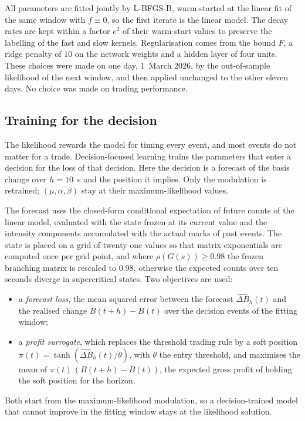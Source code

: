 \documentclass[a4paper,11pt]{article}
\begin{document}
All parameters are fitted jointly by L-BFGS-B, warm-started at the linear fit of the same window with $f \equiv 0$, so the first iterate is the linear model. The decay rates are kept within a factor $e^2$ of their warm-start values to preserve the labelling of the fast and slow kernels. Regularisation comes from the bound $F$, a ridge penalty of $10$ on the network weights and a hidden layer of four units. These choices were made on one day, 1~March 2026, by the out-of-sample likelihood of the next window, and then applied unchanged to the other eleven days. No choice was made on trading performance.

\subsection{Training for the decision}

The likelihood rewards the model for timing every event, and most events do not matter for a trade. Decision-focused learning \cite{donti2017,elmachtoub2022} trains the parameters that enter a decision for the loss of that decision. Here the decision is a forecast of the basis change over $h = 10$~s and the position it implies. Only the modulation is retrained; $(\mu, \alpha, \beta)$ stay at their maximum-likelihood values.

The forecast uses the closed-form conditional expectation of future counts of the linear model, evaluated with the state frozen at its current value and the intensity components accumulated with the actual marks of past events. The state is placed on a grid of twenty-one values so that matrix exponentials are computed once per grid point, and where $\rho(G(s)) \ge 0.98$ the frozen branching matrix is rescaled to $0.98$, otherwise the expected counts over ten seconds diverge in supercritical states. Two objectives are used:
\begin{itemize}
\item a \emph{forecast loss}, the mean squared error between the forecast $\widehat{\Delta B}_h(t)$ and the realised change $B(t+h) - B(t)$ over the decision events of the fitting window;
\item a \emph{profit surrogate}, which replaces the threshold trading rule by a soft position $\pi(t) = \tanh(\widehat{\Delta B}_h(t)/\theta)$, with $\theta$ the entry threshold, and maximises the mean of $\pi(t)\,(B(t+h) - B(t))$, the expected gross profit of holding the soft position for the horizon.
\end{itemize}
Both start from the maximum-likelihood modulation, so a decision-trained model that cannot improve in the fitting window stays at the likelihood solution.
\end{document}
